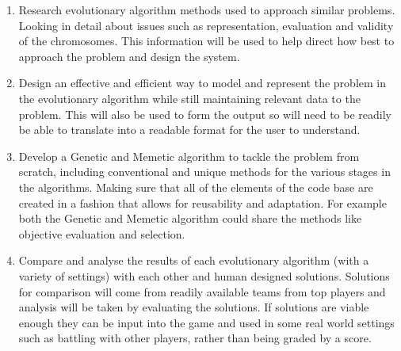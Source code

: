 \documentclass[a4paper]{article}
\begin{document}
\begin{enumerate}
    \item Research evolutionary algorithm methods used to approach similar problems.
    Looking in detail about issues such as representation, evaluation and validity of the chromosomes.
    This information will be used to help direct how best to approach the problem and design the system.
    \item Design an effective and efficient way to model and represent the problem in the evolutionary algorithm while still maintaining relevant data to the problem.
    This will also be used to form the output so will need to be readily be able to translate into a readable format for the user to understand.
    \item Develop a Genetic and Memetic algorithm to tackle the problem from scratch, including conventional and unique methods for the various stages in the algorithms.
    Making sure that all of the elements of the code base are created in a fashion that allows for reusability and adaptation.
    For example both the Genetic and Memetic algorithm could share the methods like objective evaluation and selection.
    \item Compare and analyse the results of each evolutionary algorithm (with a variety of settings) with each other and human designed solutions.
    Solutions for comparison will come from readily available teams from top players and analysis will be taken by evaluating the solutions.
    If solutions are viable enough they can be input into the game and used in some real world settings such as battling with other players, rather than being graded by a score.
\end{enumerate}
\end{document}
